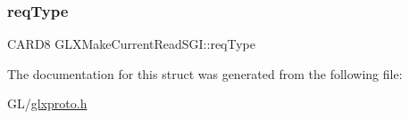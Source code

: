\subsubsection{\texorpdfstring{req\+Type}{reqType}}
{\footnotesize\ttfamily C\+A\+R\+D8 G\+L\+X\+Make\+Current\+Read\+S\+G\+I\+::req\+Type}



The documentation for this struct was generated from the following file\+:\begin{DoxyCompactItemize}
\item 
G\+L/\hyperlink{glxproto_8h}{glxproto.\+h}\end{DoxyCompactItemize}
